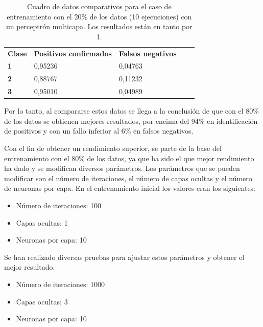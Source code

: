 \documentclass[10pt,a4paper]{article}
\begin{document}
\begin{table}[h!]
\centering
\begin{tabular}{|l|l|l|ll}
\cline{1-3}
\multicolumn{1}{|c|}{\textbf{Clase}} & \multicolumn{1}{c|}{\textbf{Positivos confirmados}} & \multicolumn{1}{c|}{\textbf{Falsos negativos}} & \multicolumn{1}{c}{\textbf{}} &  \\ \cline{1-3}
\textbf{1}                       &         0,95236                       &       0,04763                         &                               &  \\ \cline{1-3}
\textbf{2}                       &         0,88767 
&       0,11232 
&                               &  \\ \cline{1-3}
\textbf{3}                       &         0,95010                       &       0,04989 &                               &  \\ \cline{1-3}
\end{tabular}
\caption{Cuadro de datos comparativos para el caso de entrenamiento con el 20\%{} de los datos (10 ejecuciones) con un perceptrón multicapa. Los resultados están en tanto por 1.}
\label{tab:ej5_20porcent}
\end{table}

Por lo tanto, al compararse estos datos se llega a la conclusión de que con el 80\%{} de los datos se obtienen mejores resultados, por encima del 94\%{} en identificación de positivos y con un fallo inferior al 6\%{} en falsos negativos.

Con el fin de obtener un rendimiento superior, se parte de la base del entrenamiento con el 80\% de los datos, ya que ha sido el que mejor rendimiento ha dado y se modifican diversos parámetros. Los parámetros que se pueden modificar son el número de iteraciones, el número de capas ocultas y el número de neuronas por capa. En el entrenamiento inicial los valores eran los siguientes: \\
\begin{itemize}
	\item Número de iteraciones: 100
	\item Capas ocultas: 1  
	\item Neuronas por capa: 10
	
\end{itemize}

Se han realizado diversas pruebas para ajustar estos parámetros y obtener el mejor resultado.\\
\par
\begin{itemize}
	\item Número de iteraciones: 1000
	\item Capas ocultas: 3  
	\item Neuronas por capa: 10
\end{itemize}
\end{document}
